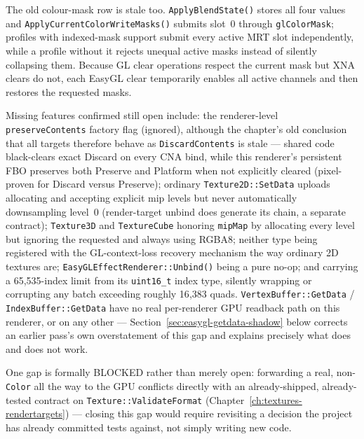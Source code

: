 The old colour-mask row is stale too. \texttt{ApplyBlendState()} stores all four
 values and \texttt{ApplyCurrentColorWriteMasks()} submits slot~0
through \texttt{glColorMask}; profiles with indexed-mask support submit every active MRT slot
independently, while a profile without it rejects unequal active masks instead of silently
collapsing them. Because GL clear operations respect the current mask but XNA clears do not, each
EasyGL clear temporarily enables all active channels and then restores the requested masks.

Missing features confirmed still open include: the renderer-level
\texttt{preserveContents} factory flag (ignored), although the chapter's old conclusion that
all targets therefore behave as \texttt{DiscardContents} is stale --- shared
 code black-clears exact Discard on every CNA bind, while this
renderer's persistent FBO preserves both Preserve and Platform when not explicitly cleared
(pixel-proven for Discard versus Preserve); ordinary \texttt{Texture2D::SetData} uploads
allocating and accepting explicit mip levels but never automatically downsampling level~0
(render-target unbind does generate its chain, a separate contract); \texttt{Texture3D} and
\texttt{TextureCube} honoring \texttt{mipMap} by allocating every level but ignoring the requested
 and always using RGBA8; neither type being registered with the
GL-context-loss recovery mechanism the way ordinary 2D textures are;
\texttt{EasyGLEffectRenderer::Unbind()} being a pure no-op; and
 carrying a 65{,}535-index limit from its \texttt{uint16\_t} index
type, silently wrapping or corrupting any batch exceeding roughly 16{,}383 quads.
\texttt{VertexBuffer::GetData} / \texttt{IndexBuffer::GetData} have no real per-renderer GPU
readback path on this renderer, or on any other --- Section~\ref{sec:easygl-getdata-shadow}
below corrects an earlier pass's own overstatement of this gap and explains precisely what
does and does not work.

One gap is formally BLOCKED rather than merely open: forwarding a real, non-\texttt{Color}
 all the way to the GPU conflicts directly with an already-shipped,
already-tested contract on \texttt{Texture::ValidateFormat} (Chapter~\ref{ch:textures-rendertargets})
--- closing this gap would require revisiting a decision the project has already committed
tests against, not simply writing new code.

